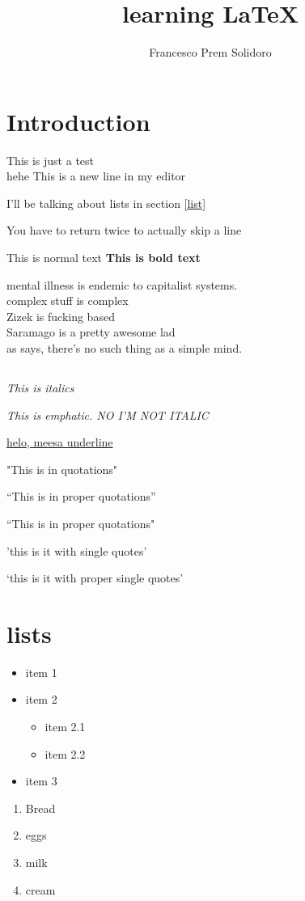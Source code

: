 \documentclass[12pt]{article}
\author{Francesco Prem Solidoro}
\title{learning {\LaTeX}}
\begin{document}
\maketitle

\section{Introduction}
This is just a test \\ hehe
This is a new line in my editor

I'll be talking about lists in section \ref{list}

You have to return twice to actually skip a line

This is normal text \textbf {This is bold text}


mental illness is endemic to capitalist systems.\cite{Cap_Realism}\\
complex stuff is complex \cite{Complexity}\\
Zizek is fucking based \cite{Perverted_Guide_Global_politics}\\
Saramago is a pretty awesome lad \cite{Blindness_Saramago}\\
as \textcite{Complexity} says, there's no such thing as a simple mind.

\subsection{}
\textit{This is italics}

\emph{This is emphatic. NO I'M NOT ITALIC}

\underline{helo, meesa underline}

"This is in quotations"


``This is in proper quotations''

``This is in proper quotations"

'this is it with single quotes'

`this is it with proper single quotes'
\section{lists\label{list}}
\begin{itemize}
	\item item 1
	\item item 2
		\begin{itemize}
			\item item 2.1
			\item item 2.2
		\end{itemize}
	\item item 3
\end{itemize}
\begin{enumerate}
	\item Bread
	\item eggs
	\item milk
	\item cream
\end{enumerate}
\printbibliography
\end{document}
